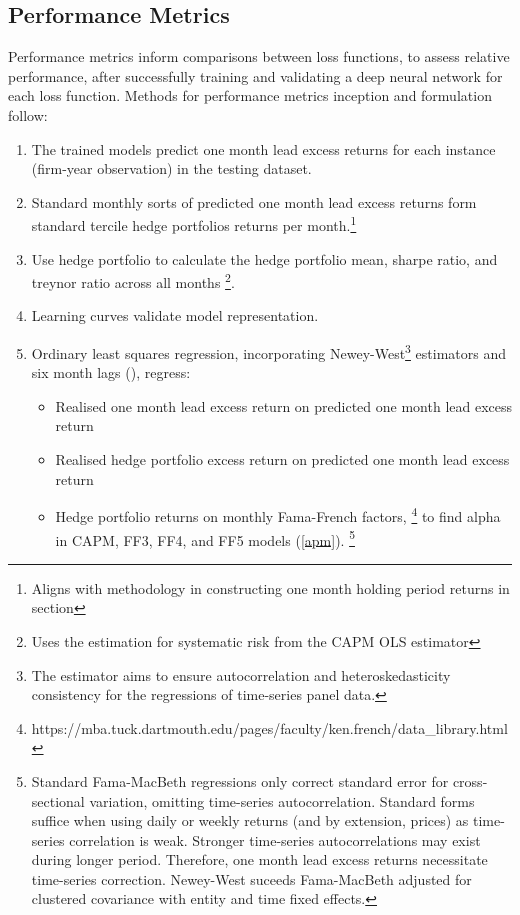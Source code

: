 \documentclass[12pt]{article}
\begin{document}
\subsection{Performance Metrics}
Performance metrics inform comparisons between loss functions, to assess relative performance, after successfully training and validating a deep neural network for each loss function.
Methods for performance metrics inception and formulation follow:
\singlespacing
\begin{enumerate}
	\item The trained models predict one month lead excess returns for each instance (firm-year observation) in the testing dataset.
	\item Standard monthly sorts of predicted one month lead excess returns form standard tercile hedge portfolios returns per month.\footnote{Aligns with methodology in constructing one month holding period returns in section }
	\item Use hedge portfolio to calculate the hedge portfolio mean, sharpe ratio, and treynor ratio across all months \footnote{Uses the estimation for systematic risk from the CAPM OLS estimator}.
	\item Learning curves validate model representation.
	\item Ordinary least squares regression, incorporating Newey-West\footnote{The estimator aims to ensure autocorrelation and heteroskedasticity consistency for the regressions of time-series panel data.} estimators and six month lags (\cite{newey1987hypothesis}),
	regress: 
	\begin{itemize}
		\item Realised one month lead excess return on predicted one month lead excess return
		\item Realised hedge portfolio excess return on predicted one month lead excess return 
		\item Hedge portfolio returns on monthly Fama-French factors, \footnote{https://mba.tuck.dartmouth.edu/pages/faculty/ken.french/data\_library.html} to find alpha in CAPM, FF3, FF4, and FF5 models (\ref{apm}).
		\footnote{Standard Fama-MacBeth regressions only correct standard error for cross-sectional variation, omitting time-series autocorrelation.
		Standard forms suffice when using daily or weekly returns (and by extension, prices) as time-series correlation is weak.
		Stronger time-series autocorrelations may exist during longer period. Therefore, one month lead excess returns necessitate time-series correction.
		Newey-West suceeds Fama-MacBeth adjusted for clustered covariance with entity and time fixed effects.}
	\end{itemize}
\end{enumerate}
\doublespacing
\newpage
\end{document}
